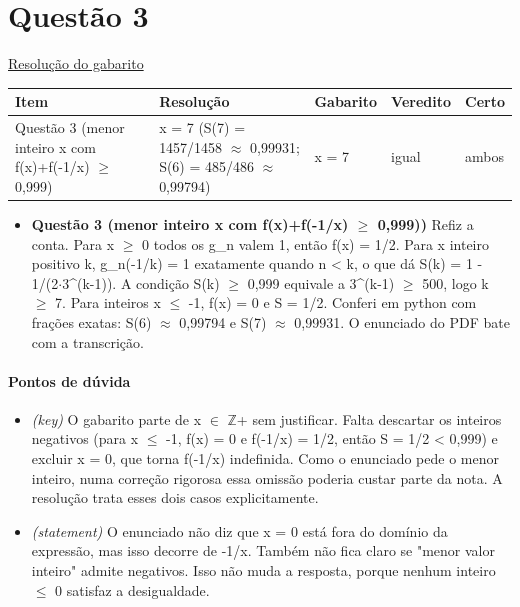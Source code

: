\documentclass{article}%
\begin{document}
\section*{Questão 3}%
\href{https://poliedroresolve.sistemapoliedro.com.br/vestibulares/ime/2027/ime-2-fase-dia-1-26-10-2026-2-fase-dia-1/dissertativa-3-matematica-2-fase-dia-1-ime-2027}{Resolução do gabarito}\par\smallskip%
\begin{longtable}{@{}p{} p{} p{} p{} p{}@{}}\toprule Item & Resolução & Gabarito & Veredito & Certo \\ \midrule
Questão 3 (menor inteiro x com f(x)+f({-}1/x) $\geq$ 0,999) & x = 7 (S(7) = 1457/1458 $\approx$ 0,99931; S(6) = 485/486 $\approx$ 0,99794) & x = 7 & igual & ambos \\
\bottomrule\end{longtable}%
\begin{itemize}%
\item%
\textbf{Questão 3 (menor inteiro x com f(x)+f({-}1/x) $\geq$ 0,999))} Refiz a conta. Para x $\geq$ 0 todos os g\_n valem 1, então f(x) = 1/2. Para x inteiro positivo k, g\_n({-}1/k) = 1 exatamente quando n < k, o que dá S(k) = 1 - 1/(2$\cdot$3\^{}(k-1)). A condição S(k) $\geq$ 0,999 equivale a 3\^{}(k-1) $\geq$ 500, logo k $\geq$ 7. Para inteiros x $\leq$ -1, f(x) = 0 e S = 1/2. Conferi em python com frações exatas: S(6) $\approx$ 0,99794 e S(7) $\approx$ 0,99931. O enunciado do PDF bate com a transcrição.%
\end{itemize}%
\paragraph{Pontos de dúvida}%
\begin{itemize}%
\item%
\textit{(key)} O gabarito parte de x $\in$ $\mathbb{Z}$+ sem justificar. Falta descartar os inteiros negativos (para x $\leq$ -1, f(x) = 0 e f(-1/x) = 1/2, então S = 1/2 < 0,999) e excluir x = 0, que torna f(-1/x) indefinida. Como o enunciado pede o menor inteiro, numa correção rigorosa essa omissão poderia custar parte da nota. A resolução trata esses dois casos explicitamente.%
\item%
\textit{(statement)} O enunciado não diz que x = 0 está fora do domínio da expressão, mas isso decorre de -1/x. Também não fica claro se "menor valor inteiro" admite negativos. Isso não muda a resposta, porque nenhum inteiro $\leq$ 0 satisfaz a desigualdade.%
\end{itemize}%
\end{document}
